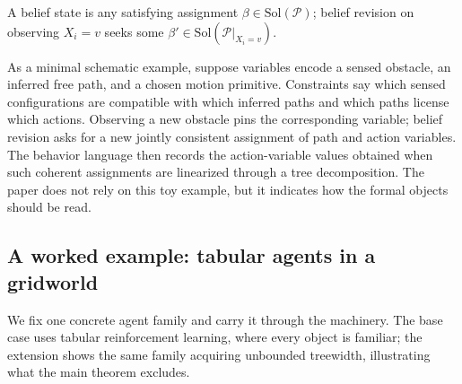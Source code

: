 \documentclass[runningheads]{llncs}
\begin{document}
A belief state is any satisfying assignment $\beta \in \mathrm{Sol}(\mathcal{P})$; belief revision on observing $X_i = v$ seeks some $\beta' \in \mathrm{Sol}(\mathcal{P}|_{X_i = v})$.

As a minimal schematic example, suppose variables encode a sensed obstacle, an inferred free path, and a chosen motion primitive. Constraints say which sensed configurations are compatible with which inferred paths and which paths license which actions. Observing a new obstacle pins the corresponding variable; belief revision asks for a new jointly consistent assignment of path and action variables. The behavior language then records the action-variable values obtained when such coherent assignments are linearized through a tree decomposition. The paper does not rely on this toy example, but it indicates how the formal objects should be read.

\subsection{A worked example: tabular agents in a gridworld}\label{sec:example}

We fix one concrete agent family and carry it through the machinery. The base case uses tabular reinforcement learning, where every object is familiar; the extension shows the same family acquiring unbounded treewidth, illustrating what the main theorem excludes.
\end{document}
